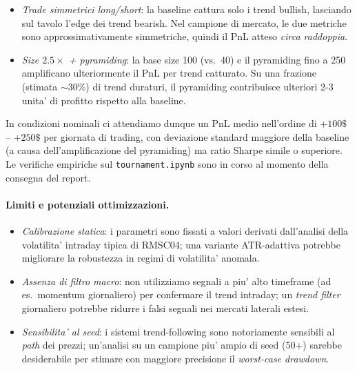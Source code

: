 \documentclass[11pt,a4paper]{article}
\begin{document}
\begin{itemize}
    \item \emph{Trade simmetrici long/short}: la baseline cattura
          solo i trend bullish, lasciando sul tavolo l'edge dei
          trend bearish.  Nel campione di mercato, le due metriche
          sono approssimativamente simmetriche, quindi il PnL atteso
          \emph{circa raddoppia}.
    \item \emph{Size $2.5\times$ + pyramiding}: la base size 100
          (vs.\ 40) e il pyramiding fino a 250 amplificano
          ulteriormente il PnL per trend catturato.  Su una
          frazione (stimata $\sim$30\%) di trend duraturi, il
          pyramiding contribuisce ulteriori 2-3 unita' di profitto
          rispetto alla baseline.
\end{itemize}

In condizioni nominali ci attendiamo dunque un PnL medio
nell'ordine di $+100\$$ -- $+250\$$ per giornata di trading, con
deviazione standard maggiore della baseline (a causa
dell'amplificazione del pyramiding) ma ratio Sharpe simile o
superiore.  Le verifiche empiriche sul \texttt{tournament.ipynb}
sono in corso al momento della consegna del report.

\paragraph{Limiti e potenziali ottimizzazioni.}
\begin{itemize}
    \item \emph{Calibrazione statica}: i parametri sono fissati a
          valori derivati dall'analisi della volatilita' intraday
          tipica di RMSC04; una variante ATR-adattiva potrebbe
          migliorare la robustezza in regimi di volatilita' anomala.
    \item \emph{Assenza di filtro macro}: non utilizziamo segnali
          a piu' alto timeframe (ad es.\ momentum giornaliero) per
          confermare il trend intraday; un \emph{trend filter}
          giornaliero potrebbe ridurre i falsi segnali nei
          mercati laterali estesi.
    \item \emph{Sensibilita' al seed}: i sistemi trend-following
          sono notoriamente sensibili al \emph{path} dei prezzi;
          un'analisi su un campione piu' ampio di seed (50+) sarebbe
          desiderabile per stimare con maggiore precisione il
          \emph{worst-case drawdown}.
\end{itemize}
\end{document}
